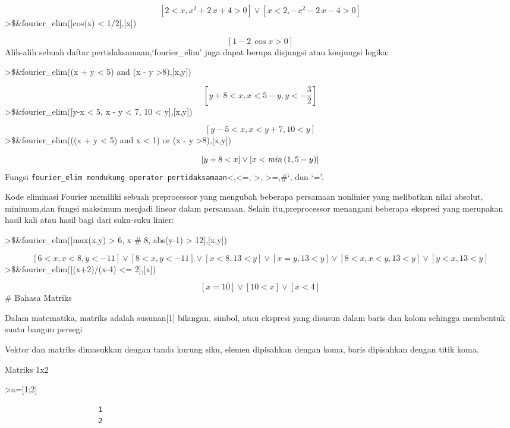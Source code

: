\documentclass[
]{book}
\begin{document}
\[\left[ 2<x , x^2+2\,x+4>0 \right] \lor \left[ x<2 , -x^2-2\,x-4>0
  \right] \]\textgreater\$\&fourier\_elim({[}cos(x) \textless{} 1/2{]},{[}x{]})

\[\left[ 1-2\,\cos x>0 \right] \]Alih-alih sebuah daftar pertidaksamaan,`fourier\_elim' juga dapat berupa disjungsi atau konjungsi logika:

\textgreater\$\&fourier\_elim((x + y \textless{} 5) and (x - y \textgreater8),{[}x,y{]})

\[\left[ y+8<x , x<5-y , y<-\frac{3}{2} \right] \]\textgreater\$\&fourier\_elim({[}y-x \textless{} 5, x - y \textless{} 7, 10 \textless{} y{]},{[}x,y{]})

\[\left[ y-5<x , x<y+7 , 10<y \right] \]\textgreater\$\&fourier\_elim(((x + y \textless{} 5) and x \textless{} 1) or (x - y \textgreater8),{[}x,y{]})

\[\left[ y+8<x \right] \lor \left[ x<{\it min}\left(1 , 5-y\right)
  \right] \]Fungsi \texttt{fourier\_elim\textquotesingle{}\ mendukung\ operator\ pertidaksamaan}\textless,\textless=, \textgreater, \textgreater=,\#`, dan `='.

Kode eliminasi Fourier memiliki sebuah preprocessor yang mengubah beberapa persamaan nonlinier yang melibatkan nilai absolut, minimum,dan fungsi maksimum menjadi linear dalam persamaan. Selain itu,preprocessor menangani beberapa ekspresi yang merupakan hasil kali atau hasil bagi dari suku-suku linier:

\textgreater\$\&fourier\_elim({[}max(x,y) \textgreater{} 6, x \# 8, abs(y-1) \textgreater{} 12{]},{[}x,y{]})

\[\left[ 6<x , x<8 , y<-11 \right] \lor \left[ 8<x , y<-11 \right] 
 \lor \left[ x<8 , 13<y \right] \lor \left[ x=y , 13<y \right] \lor 
 \left[ 8<x , x<y , 13<y \right] \lor \left[ y<x , 13<y \right] \]\textgreater\$\&fourier\_elim({[}(x+2)/(x-4) \textless= 2{]},{[}x{]})

\[\left[ x=10 \right] \lor \left[ 10<x \right] \lor \left[ x<4
  \right] \]\# Bahasa Matriks

Dalam matematika, matriks adalah susunan{[}1{]} bilangan, simbol, atau ekspresi yang disusun dalam baris dan kolom sehingga membentuk suatu bangun persegi

Vektor dan matriks dimasukkan dengan tanda kurung siku, elemen dipisahkan dengan koma, baris dipisahkan dengan titik koma.

Matriks 1x2

\textgreater a={[}1;2{]}

\begin{verbatim}
                      1 
                      2 
\end{verbatim}
\end{document}
